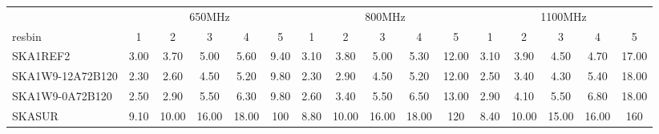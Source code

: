 \begin{table}[!htp]
{{\begin{tabular}{|lccccc||ccccc||ccccc|}
 \tabularnewline \cline{2-16} \multicolumn{1}{c}{ } & \multicolumn{5}{|c}{650MHz}  & \multicolumn{5}{c}{800MHz}  & \multicolumn{5}{c|}{1100MHz} \tabularnewline \cline{1-16} 
 resbin  &1 & 2 & 3 & 4 & 5 & 1 & 2 & 3 & 4 & 5 & 1 & 2 & 3 & 4 & 5 \tabularnewline \hline
SKA1REF2 & 3.00 \cellcolor{blue!22.32} & 3.70 \cellcolor{red!24.24} & 5.00 \cellcolor{green!19.83} & 5.60 \cellcolor{orange!19.31} & 9.40 \cellcolor{purple!18.00} & 3.10 \cellcolor{blue!23.17} & 3.80 \cellcolor{red!23.32} & 5.00 \cellcolor{green!19.83} & 5.30 \cellcolor{orange!18.33} & 12.00 \cellcolor{purple!18.00} & 3.10 \cellcolor{blue!22.27} & 3.90 \cellcolor{red!21.18} & 4.50 \cellcolor{green!18.79} & 4.70 \cellcolor{orange!18.00} & 17.00 \cellcolor{purple!18.00}\\ \hline 
SKA1W9-12A72B120 & 2.30 \cellcolor{blue!18.00} & 2.60 \cellcolor{red!18.00} & 4.50 \cellcolor{green!18.00} & 5.20 \cellcolor{orange!18.00} & 9.80 \cellcolor{purple!18.19} & 2.30 \cellcolor{blue!18.00} & 2.90 \cellcolor{red!18.00} & 4.50 \cellcolor{green!18.00} & 5.20 \cellcolor{orange!18.00} & 12.00 \cellcolor{purple!18.00} & 2.50 \cellcolor{blue!18.00} & 3.40 \cellcolor{red!18.00} & 4.30 \cellcolor{green!18.00} & 5.40 \cellcolor{orange!20.60} & 18.00 \cellcolor{purple!18.29}\\ \hline 
SKA1W9-0A72B120 & 2.50 \cellcolor{blue!19.24} & 2.90 \cellcolor{red!19.70} & 5.50 \cellcolor{green!21.65} & 6.30 \cellcolor{orange!21.61} & 9.80 \cellcolor{purple!18.19} & 2.60 \cellcolor{blue!19.94} & 3.40 \cellcolor{red!20.96} & 5.50 \cellcolor{green!21.65} & 6.50 \cellcolor{orange!22.27} & 13.00 \cellcolor{purple!18.39} & 2.90 \cellcolor{blue!20.85} & 4.10 \cellcolor{red!22.45} & 5.50 \cellcolor{green!22.71} & 6.80 \cellcolor{orange!25.81} & 18.00 \cellcolor{purple!18.29}\\ \hline 
SKASUR & 9.10 \cellcolor{blue!60.00} & 10.00 \cellcolor{red!60.00} & 16.00 \cellcolor{green!60.00} & 18.00 \cellcolor{orange!60.00} & 100 \cellcolor{purple!60.00} & 8.80 \cellcolor{blue!60.00} & 10.00 \cellcolor{red!60.00} & 16.00 \cellcolor{green!60.00} & 18.00 \cellcolor{orange!60.00} & 120 \cellcolor{purple!60.00} & 8.40 \cellcolor{blue!60.00} & 10.00 \cellcolor{red!60.00} & 15.00 \cellcolor{green!60.00} & 16.00 \cellcolor{orange!60.00} & 160 \cellcolor{purple!60.00}\tabularnewline \hline 
\end{tabular}}\hfil 
{}}
\end{table}
